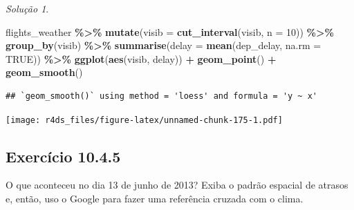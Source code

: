\documentclass[
]{latex/krantz}
\newenvironment{Shaded}{\begin{snugshade}}{\end{snugshade}}
\newcommand{\AttributeTok}[1]{\textcolor[rgb]{0.13,0.29,0.53}{#1}}
\newcommand{\ConstantTok}[1]{\textcolor[rgb]{0.56,0.35,0.01}{#1}}
\newcommand{\DecValTok}[1]{\textcolor[rgb]{0.00,0.00,0.81}{#1}}
\newcommand{\FunctionTok}[1]{\textcolor[rgb]{0.13,0.29,0.53}{\textbf{#1}}}
\newcommand{\NormalTok}[1]{#1}
\newcommand{\SpecialCharTok}[1]{\textcolor[rgb]{0.81,0.36,0.00}{\textbf{#1}}}
\theoremstyle{definition}
\theoremstyle{definition}
\theoremstyle{definition}
\theoremstyle{definition}
\theoremstyle{remark}
\newtheorem*{solution}{Solução}
\begin{document}
\begin{solution}
\begin{Shaded}
\begin{Highlighting}[]
\NormalTok{flights\_weather }\SpecialCharTok{\%\textgreater{}\%}
  \FunctionTok{mutate}\NormalTok{(}\AttributeTok{visib =} \FunctionTok{cut\_interval}\NormalTok{(visib, }\AttributeTok{n =} \DecValTok{10}\NormalTok{)) }\SpecialCharTok{\%\textgreater{}\%}
  \FunctionTok{group\_by}\NormalTok{(visib) }\SpecialCharTok{\%\textgreater{}\%}
  \FunctionTok{summarise}\NormalTok{(}\AttributeTok{delay =} \FunctionTok{mean}\NormalTok{(dep\_delay, }\AttributeTok{na.rm =} \ConstantTok{TRUE}\NormalTok{)) }\SpecialCharTok{\%\textgreater{}\%}
  \FunctionTok{ggplot}\NormalTok{(}\FunctionTok{aes}\NormalTok{(visib, delay)) }\SpecialCharTok{+}
    \FunctionTok{geom\_point}\NormalTok{() }\SpecialCharTok{+}
    \FunctionTok{geom\_smooth}\NormalTok{()}
\end{Highlighting}
\end{Shaded}

\begin{verbatim}
## `geom_smooth()` using method = 'loess' and formula = 'y ~ x'
\end{verbatim}

\texttt{[image: r4ds\_files/figure-latex/unnamed-chunk-175-1.pdf]}
\end{solution}

\hypertarget{exr10-4-5}{%
\subsection*{Exercício 10.4.5}\label{exr10-4-5}}

O que aconteceu no dia 13 de junho de 2013? Exiba o padrão espacial de atrasos e, então, uso o Google para fazer uma referência cruzada com o clima.
\end{document}
